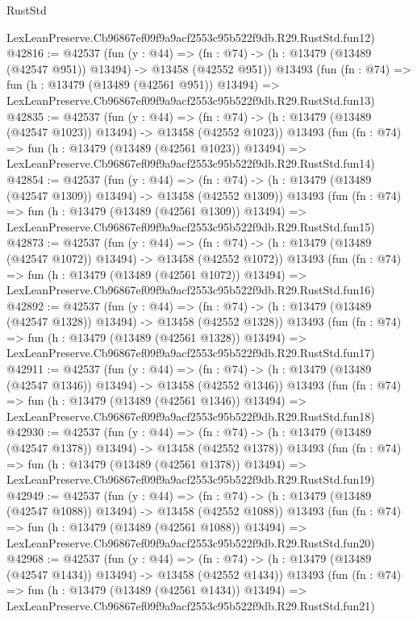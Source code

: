\begin{lexlean}{RustStd}
\begin{coremodule}
    LexLeanPreserve.Cb96867ef09f9a9acf2553c95b522f9db.R29.RustStd.fun12)
@42816 := @42537
    (fun (y : @44) =>
    (fn : @74) -> (h : @13479 (@13489 (@42547 @951)) @13494) -> @13458 (@42552 @951))
    @13493
    (fun (fn : @74) =>
    fun (h : @13479 (@13489 (@42561 @951)) @13494) =>
    LexLeanPreserve.Cb96867ef09f9a9acf2553c95b522f9db.R29.RustStd.fun13)
@42835 := @42537
    (fun (y : @44) =>
    (fn : @74) -> (h : @13479 (@13489 (@42547 @1023)) @13494) -> @13458 (@42552 @1023))
    @13493
    (fun (fn : @74) =>
    fun (h : @13479 (@13489 (@42561 @1023)) @13494) =>
    LexLeanPreserve.Cb96867ef09f9a9acf2553c95b522f9db.R29.RustStd.fun14)
@42854 := @42537
    (fun (y : @44) =>
    (fn : @74) -> (h : @13479 (@13489 (@42547 @1309)) @13494) -> @13458 (@42552 @1309))
    @13493
    (fun (fn : @74) =>
    fun (h : @13479 (@13489 (@42561 @1309)) @13494) =>
    LexLeanPreserve.Cb96867ef09f9a9acf2553c95b522f9db.R29.RustStd.fun15)
@42873 := @42537
    (fun (y : @44) =>
    (fn : @74) -> (h : @13479 (@13489 (@42547 @1072)) @13494) -> @13458 (@42552 @1072))
    @13493
    (fun (fn : @74) =>
    fun (h : @13479 (@13489 (@42561 @1072)) @13494) =>
    LexLeanPreserve.Cb96867ef09f9a9acf2553c95b522f9db.R29.RustStd.fun16)
@42892 := @42537
    (fun (y : @44) =>
    (fn : @74) -> (h : @13479 (@13489 (@42547 @1328)) @13494) -> @13458 (@42552 @1328))
    @13493
    (fun (fn : @74) =>
    fun (h : @13479 (@13489 (@42561 @1328)) @13494) =>
    LexLeanPreserve.Cb96867ef09f9a9acf2553c95b522f9db.R29.RustStd.fun17)
@42911 := @42537
    (fun (y : @44) =>
    (fn : @74) -> (h : @13479 (@13489 (@42547 @1346)) @13494) -> @13458 (@42552 @1346))
    @13493
    (fun (fn : @74) =>
    fun (h : @13479 (@13489 (@42561 @1346)) @13494) =>
    LexLeanPreserve.Cb96867ef09f9a9acf2553c95b522f9db.R29.RustStd.fun18)
@42930 := @42537
    (fun (y : @44) =>
    (fn : @74) -> (h : @13479 (@13489 (@42547 @1378)) @13494) -> @13458 (@42552 @1378))
    @13493
    (fun (fn : @74) =>
    fun (h : @13479 (@13489 (@42561 @1378)) @13494) =>
    LexLeanPreserve.Cb96867ef09f9a9acf2553c95b522f9db.R29.RustStd.fun19)
@42949 := @42537
    (fun (y : @44) =>
    (fn : @74) -> (h : @13479 (@13489 (@42547 @1088)) @13494) -> @13458 (@42552 @1088))
    @13493
    (fun (fn : @74) =>
    fun (h : @13479 (@13489 (@42561 @1088)) @13494) =>
    LexLeanPreserve.Cb96867ef09f9a9acf2553c95b522f9db.R29.RustStd.fun20)
@42968 := @42537
    (fun (y : @44) =>
    (fn : @74) -> (h : @13479 (@13489 (@42547 @1434)) @13494) -> @13458 (@42552 @1434))
    @13493
    (fun (fn : @74) =>
    fun (h : @13479 (@13489 (@42561 @1434)) @13494) =>
    LexLeanPreserve.Cb96867ef09f9a9acf2553c95b522f9db.R29.RustStd.fun21)

\end{coremodule}
\end{lexlean}
